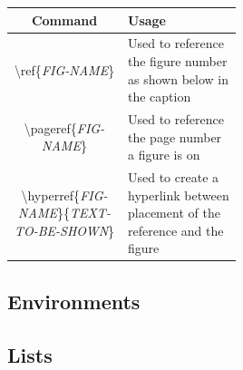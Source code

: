 \documentclass{article}
\newcommand{\bs}[1]{\textbackslash{}#1} %
\begin{document}
\begin{table}[h]
    \centering
    \begin{tabular}{|c|p{0.50\linewidth}|}
        \hline
        \rowcolor{gray!30}
        Command & Usage \\
        \hline
        \bs{ref\{\textit{FIG-NAME}\}} & Used to reference the figure number as shown below in the caption \\
        \hline
        \bs{pageref\{\textit{FIG-NAME}\}} & Used to reference the page number a figure is on \\
        \hline
        \bs{hyperref\{\textit{FIG-NAME}\}\{\textit{TEXT-TO-BE-SHOWN}\}} & Used to create a hyperlink between placement of the reference
         and the figure \\
        \hline
    \end{tabular}
\end{table}



\subsection{Environments}

\subsection{Lists}

\newpage


\end{document}
